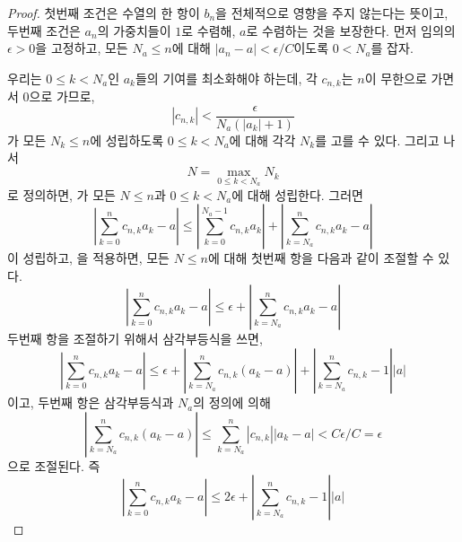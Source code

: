 \begin{proof}
    첫번째 조건은 수열의 한 항이 $b_n$을 전체적으로 영향을 주지 않는다는 뜻이고, 두번째 조건은 $a_n$의 가중치들이 $1$로 수렴해, $a$로 수렴하는 것을 보장한다.
    먼저 임의의 $\epsilon > 0$을 고정하고, 모든 $N_a \leq n$에 대해 $|a_n - a| < \epsilon/C$이도록 $0 <N_a$를 잡자.

    우리는 $0 \leq k < N_a$인 $a_k$들의 기여를 최소화해야 하는데, 각 $c_{n, k}$는 $n$이 무한으로 가면서 $0$으로 가므로,
    \begin{equation}
    \label{eq:toepest1}
        |c_{n, k}| < \frac{\epsilon}{N_a (|a_k| + 1)}
    \end{equation}
    가 모든 $N_k \leq n$에 성립하도록 $0 \leq k < N_a$에 대해 각각 $N_k$를 고를 수 있다.
    그리고 나서 
    \begin{equation*}
        N = \max_{0 \leq k < N_a} N_k
    \end{equation*}
    로 정의하면, 가 모든 $N \leq n$과 $0 \leq k < N_a$에 대해 성립한다.
    그러면
    \begin{equation*}
        \left| \sum_{k = 0}^n c_{n, k} a_k  - a \right| \leq \left| \sum_{k = 0}^{N_a - 1} c_{n, k} a_k \right| + \left| \sum_{k = N_a}^n c_{n, k} a_k  - a \right|
    \end{equation*}
    이 성립하고, 을 적용하면, 모든 $N \leq n$에 대해 첫번째 항을 다음과 같이 조절할 수 있다.
    \begin{equation*}
        \left| \sum_{k = 0}^n c_{n, k} a_k  - a \right| \leq \epsilon + \left| \sum_{k = N_a}^n c_{n, k} a_k  - a \right|
    \end{equation*}
    두번째 항을 조절하기 위해서 삼각부등식을 쓰면,
    \begin{equation*}
        \left| \sum_{k = 0}^n c_{n, k} a_k  - a \right| \leq \epsilon + \left| \sum_{k = N_a}^n c_{n, k} (a_k - a) \right| + \left| \sum_{k = N_a}^n c_{n, k} - 1 \right| |a|
    \end{equation*}
    이고, 두번째 항은 삼각부등식과 $N_a$의 정의에 의해
    \begin{equation*}
        \left| \sum_{k = N_a}^n c_{n, k} (a_k - a) \right| \leq \sum_{k = N_a}^n |c_{n, k}| |a_k - a| < C \epsilon / C = \epsilon
    \end{equation*}
    으로 조절된다.
    즉 
    \begin{equation*}
        \left| \sum_{k = 0}^n c_{n, k} a_k  - a \right| \leq 2\epsilon + \left| \sum_{k = N_a}^n c_{n, k} - 1 \right| |a|
    \end{equation*}

\end{proof}

